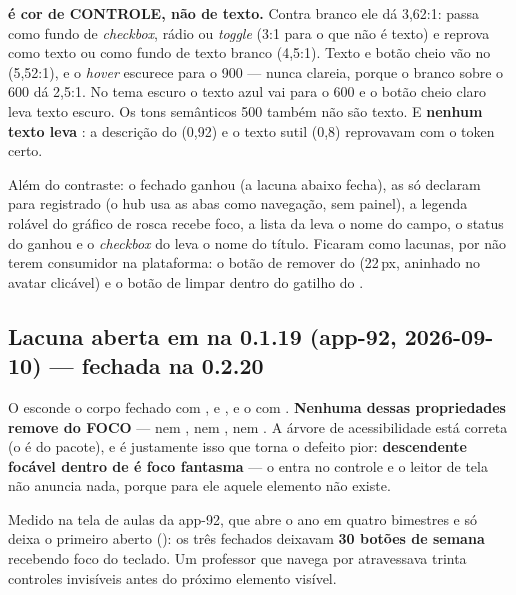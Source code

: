 \begin{regra}
\textbf{ é cor de CONTROLE, não de texto.} Contra branco ele
dá 3,62:1: passa como fundo de \emph{checkbox}, rádio ou \emph{toggle} (3:1 para o
que não é texto) e reprova como texto ou como fundo de texto branco (4,5:1).
Texto e botão cheio vão no  (5,52:1), e o \emph{hover} escurece
para o 900 --- nunca clareia, porque o branco sobre o 600 dá 2,5:1. No tema
escuro o texto azul vai para o 600 e o botão cheio claro leva texto escuro. Os
tons semânticos 500 também não são texto. E \textbf{nenhum texto leva
}: a descrição do  (0,92) e o texto sutil (0,8)
reprovavam com o token certo.
\end{regra}

Além do contraste: o  fechado ganhou  (a lacuna abaixo
fecha), as  só declaram  para 
registrado (o hub usa as abas como navegação, sem painel), a legenda rolável do
gráfico de rosca recebe foco, a lista da  leva o nome do campo, o
status do  ganhou  e o \emph{checkbox} do
 leva o nome do título. Ficaram como lacunas, por não terem
consumidor na plataforma: o botão de remover do  (22\,px, aninhado no
avatar clicável) e o botão de limpar dentro do gatilho do .

\subsection{Lacuna aberta em  na 0.1.19 (app-92, 2026-09-10) --- fechada na 0.2.20}

O  esconde o corpo fechado com ,
 e , e o  com
. \textbf{Nenhuma dessas propriedades remove do FOCO} ---
nem , nem , nem . A árvore de
acessibilidade está correta (o  é do pacote), e é justamente
isso que torna o defeito pior: \textbf{descendente focável dentro de
 é foco fantasma} --- o  entra no controle e o
leitor de tela não anuncia nada, porque para ele aquele elemento não existe.

Medido na tela de aulas da app-92, que abre o ano em quatro bimestres e só deixa
o primeiro aberto (): os três fechados deixavam \textbf{30
botões de semana} recebendo foco do teclado. Um professor que navega por
 atravessava trinta controles invisíveis antes do próximo elemento
visível.

